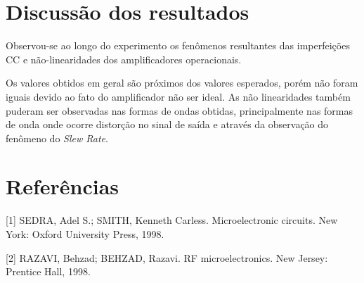 \documentclass{abntex2}
\begin{document}
\section{Discussão dos resultados}

Observou-se ao longo do experimento os fenômenos resultantes das imperfeições CC e não-linearidades dos amplificadores operacionais.

Os valores obtidos em geral são próximos dos valores esperados, porém não foram iguais devido ao fato do amplificador não ser ideal. As não linearidades também puderam ser observadas nas formas de ondas obtidas, principalmente nas formas de onda onde ocorre distorção no sinal de saída e através da observação do fenômeno do \emph{Slew Rate}.

\clearpage

\section*{Referências}

[1] SEDRA, Adel S.; SMITH, Kenneth Carless. Microelectronic circuits. New York: Oxford University Press, 1998.

[2] RAZAVI, Behzad; BEHZAD, Razavi. RF microelectronics. New Jersey: Prentice Hall, 1998.
\end{document}
